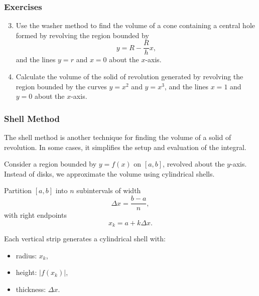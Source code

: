 \subsubsection{Exercises}
\label{sss:exer-washer}

\begin{enumerate}
\setcounter{enumi}{2}

\item Use the washer method to find the volume of a cone containing a 
central hole formed by revolving the region bounded by
\[
y = R - \frac{R}{h}x,
\]
and the lines $y=r$ and $x=0$ about the $x$-axis.

\item Calculate the volume of the solid of revolution generated by 
revolving the region bounded by the curves $y = x^2$ and $y = x^3$, 
and the lines $x=1$ and $y=0$ about the $x$-axis.
\end{enumerate}

\subsubsection{Shell Method}
\label{sss:shel-beba}

The shell method is another technique for finding the volume of a solid 
of revolution. In some cases, it simplifies the setup and evaluation of 
the integral.

\medskip

Consider a region bounded by $y=f(x)$ on $[a,b]$, revolved about the 
$y$-axis. Instead of disks, we approximate the volume using cylindrical 
shells.

\medskip

Partition $[a,b]$ into $n$ subintervals of width
\[
\Delta x = \frac{b-a}{n},
\]
with right endpoints
\[
x_k = a + k\Delta x.
\]

Each vertical strip generates a cylindrical shell with:
\begin{itemize}
\item radius: $x_k$,
\item height: $|f(x_k)|$,
\item thickness: $\Delta x$.
\end{itemize}

